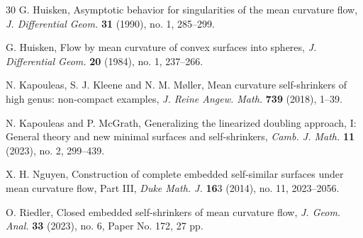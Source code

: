 \documentclass{amsart}
\theoremstyle{Corollary}
\numberwithin{equation}{section}
\begin{document}
\begin{thebibliography}{30}
G. Huisken,
Asymptotic behavior for singularities of the mean curvature flow,
\textit{J. Differential Geom.} \textbf{31} (1990), no. 1, 285–299. 

G. Huisken,  Flow by mean curvature of convex surfaces into spheres, 
\textit{J. Differential Geom.} \textbf{20} (1984), no. 1, 237–266. 

N. Kapouleas, S. J. Kleene and N. M. Møller,  
Mean curvature self-shrinkers of high genus: non-compact examples,  
\textit{J. Reine Angew. Math.} \textbf{739} (2018), 1–39. 

N. Kapouleas and P. McGrath, 
Generalizing the linearized doubling approach, I: General theory and new minimal surfaces and self-shrinkers, 
\textit{Camb. J. Math.} \textbf{11} (2023), no. 2, 299–439. 

X. H. Nguyen,  
Construction of complete embedded self-similar surfaces under mean curvature flow, Part III, 
\textit{Duke Math. J.} \textbf{16}3 (2014), no. 11, 2023–2056. 

O. Riedler,  
Closed embedded self-shrinkers of mean curvature flow, 
\textit{J. Geom. Anal.} \textbf{33} (2023), no. 6, Paper No. 172, 27 pp. 

\end{thebibliography}
\end{document}
